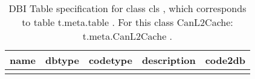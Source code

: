 \documentclass[10pt,twoside]{article}
\begin{document}
\begin{center}
\begin{table}
\begin{tabular}{lllll}\\\hline
           \bf{name} 
        &  \bf{dbtype}
        &  \bf{codetype}
        &  \bf{description}
        &  \bf{code2db}
        \\\hline
{%
{%
\end{tabular}
\caption{ DBI Table specification for class {{ cls }}, which corresponds to table {{ t.meta.table }}. For this class CanL2Cache:{{ t.meta.CanL2Cache }}.   }
\end{table}
\end{center}
\end{document}
